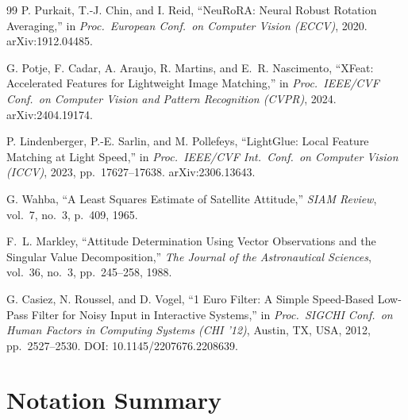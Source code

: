 \documentclass[11pt]{article}
\begin{document}
\begin{thebibliography}{99}
P. Purkait, T.-J. Chin, and I. Reid, ``NeuRoRA: Neural Robust Rotation Averaging,'' in \textit{Proc.\ European Conf.\ on Computer Vision (ECCV)}, 2020. arXiv:1912.04485.

G. Potje, F. Cadar, A. Araujo, R. Martins, and E.~R. Nascimento, ``XFeat: Accelerated Features for Lightweight Image Matching,'' in \textit{Proc.\ IEEE/CVF Conf.\ on Computer Vision and Pattern Recognition (CVPR)}, 2024. arXiv:2404.19174.

P. Lindenberger, P.-E. Sarlin, and M. Pollefeys, ``LightGlue: Local Feature Matching at Light Speed,'' in \textit{Proc.\ IEEE/CVF Int.\ Conf.\ on Computer Vision (ICCV)}, 2023, pp.~17627--17638. arXiv:2306.13643.

G. Wahba, ``A Least Squares Estimate of Satellite Attitude,'' \textit{SIAM Review}, vol.~7, no.~3, p.~409, 1965.

F.~L. Markley, ``Attitude Determination Using Vector Observations and the Singular Value Decomposition,'' \textit{The Journal of the Astronautical Sciences}, vol.~36, no.~3, pp.~245--258, 1988.

G. Casiez, N. Roussel, and D. Vogel, ``1 Euro Filter: A Simple Speed-Based Low-Pass Filter for Noisy Input in Interactive Systems,'' in \textit{Proc.\ SIGCHI Conf.\ on Human Factors in Computing Systems (CHI '12)}, Austin, TX, USA, 2012, pp.~2527--2530. DOI: 10.1145/2207676.2208639.

\end{thebibliography}

\appendix
\section{Notation Summary}
\end{document}
